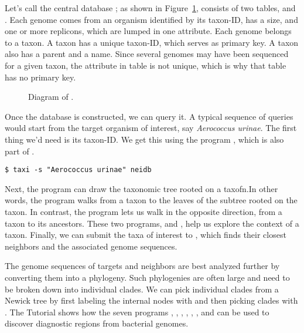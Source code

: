 Let's call the central database ; as shown in
Figure~\ref{fig:db},  consists of two
tables,  and . Each genome comes from an organism
identified by its taxon-ID, has a size, and one or more replicons,
which are lumped in one attribute. Each genome belongs to a taxon. A
taxon has a unique taxon-ID, which serves as primary key. A taxon also
has a parent and a name. Since several genomes may have been sequenced for a
given taxon, the attribute  in
table  is not unique, which is why that table has no
primary key.

\begin{figure}
  \begin{center}
    
  \end{center}
  \caption{Diagram of .}\label{fig:db}
\end{figure}

Once the database is constructed, we can query it. A typical sequence
of queries would start from the target organism of interest,
say \emph{Aerococcus urinae}. The first thing we'd need is its
taxon-ID. We get this using the program , which is also part
of .
\begin{verbatim}
$ taxi -s "Aerococcus urinae" neidb
\end{verbatim}
Next, the program  can draw the taxonomic tree rooted on a
taxofn.In other words, the program  walks from a taxon to the
leaves of the subtree rooted on the taxon. In contrast, the
program  lets us walk in the opposite direction, from a taxon
to its ancestors. These two programs,  and , help us
explore the context of a taxon. Finally, we can submit the taxa of
interest to , which finds their closest neighbors and
the associated genome sequences.

The genome sequences of targets and neighbors are best analyzed
further by converting them into a phylogeny. Such phylogenies are
often large and need to be broken down into individual clades. We can
pick individual clades from a Newick tree by first labeling the
internal nodes with  and then picking clades
with . The Tutorial shows how the seven
programs , , , ,
, , and  can be used to discover
diagnostic regions from bacterial genomes.
